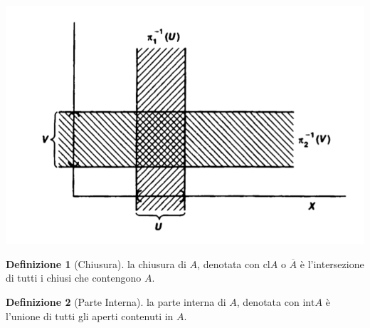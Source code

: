 \documentclass[10pt,a4paper]{article}
\theoremstyle{definition}
\newtheorem{defi}{Definizione}
\theoremstyle{plain}
\theoremstyle{remark}
\theoremstyle{remark}
\begin{document}
\begin{center}
\includegraphics[scale=0.5]{prebaseprod.png}
\end{center}




\begin{defi}[Chiusura] la chiusura di $A$, denotata con $\text{cl}A$ o
$\overline{A}$ è l'intersezione di tutti i chiusi che contengono $A$.
\end{defi}

\begin{defi}[Parte Interna] la parte interna di $A$, denotata con $\text{int}A$
è l'unione di tutti gli aperti contenuti in $A$.
\end{defi}
\end{document}
